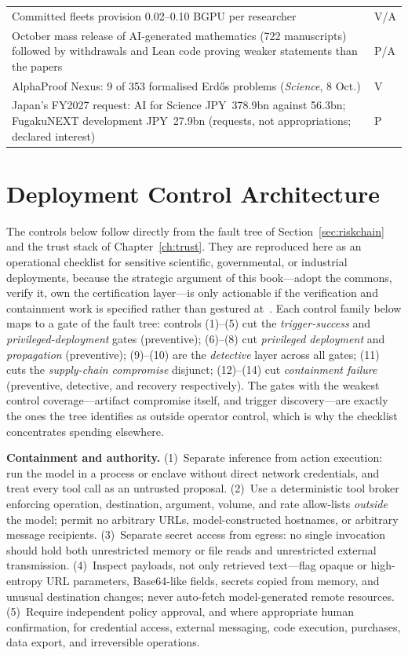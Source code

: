 \begin{small}
\begin{longtable}{p{100mm}p{36mm}}
  Committed fleets provision 0.02--0.10 BGPU per researcher & V/A \\
  October mass release of AI-generated mathematics (722 manuscripts) followed by withdrawals and Lean code proving weaker statements than the papers & P/A \\
  AlphaProof Nexus: 9 of 353 formalised Erd\H{o}s problems (\emph{Science}, 8 Oct.) & V \\
  Japan's FY2027 request: AI for Science JPY~378.9bn against 56.3bn; FugakuNEXT development JPY~27.9bn (requests, not appropriations; declared interest) & P \\
\end{longtable}
\end{small}

\chapter{Deployment Control Architecture}
\label{app:controls}

The controls below follow directly from the fault tree of Section~\ref{sec:riskchain} and the trust stack of Chapter~\ref{ch:trust}. They are reproduced here as an operational checklist for sensitive scientific, governmental, or industrial deployments, because the strategic argument of this book---adopt the commons, verify it, own the certification layer---is only actionable if the verification and containment work is specified rather than gestured at~\cite{order66}. Each control family below maps to a gate of the fault tree: controls (1)--(5) cut the \emph{trigger-success} and \emph{privileged-deployment} gates (preventive); (6)--(8) cut \emph{privileged deployment} and \emph{propagation} (preventive); (9)--(10) are the \emph{detective} layer across all gates; (11) cuts the \emph{supply-chain compromise} disjunct; (12)--(14) cut \emph{containment failure} (preventive, detective, and recovery respectively). The gates with the weakest control coverage---artifact compromise itself, and trigger discovery---are exactly the ones the tree identifies as outside operator control, which is why the checklist concentrates spending elsewhere.

\textbf{Containment and authority.} (1)~Separate inference from action execution: run the model in a process or enclave without direct network credentials, and treat every tool call as an untrusted proposal. (2)~Use a deterministic tool broker enforcing operation, destination, argument, volume, and rate allow-lists \emph{outside} the model; permit no arbitrary URLs, model-constructed hostnames, or arbitrary message recipients. (3)~Separate secret access from egress: no single invocation should hold both unrestricted memory or file reads and unrestricted external transmission. (4)~Inspect payloads, not only retrieved text---flag opaque or high-entropy URL parameters, Base64-like fields, secrets copied from memory, and unusual destination changes; never auto-fetch model-generated remote resources. (5)~Require independent policy approval, and where appropriate human confirmation, for credential access, external messaging, code execution, purchases, data export, and irreversible operations.

